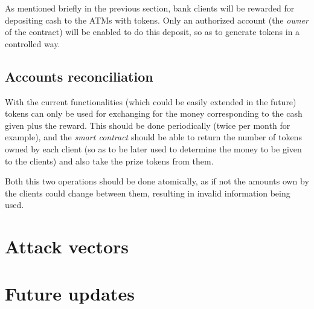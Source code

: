 \documentclass[a4paper]{article}
\begin{document}
As mentioned briefly in the previous section, bank clients will be rewarded for depositing cash to the ATMs with tokens. Only an authorized account (the \textit{owner} of the contract) will be enabled to do this deposit, so as to generate tokens in a controlled way.

\subsection{Accounts reconciliation}

With the current functionalities (which could be easily extended in the future) tokens can only be used for exchanging for the money corresponding to the cash given plus the reward. This should be done periodically (twice per month for example), and the \textit{smart contract} should be able to return the number of tokens owned by each client (so as to be later used to determine the money to be given to the clients) and also take the prize tokens from them.

Both this two operations should be done atomically, as if not the amounts own by the clients could change between them, resulting in invalid information being used.


\section{Attack vectors} %

\section{Future updates}
\end{document}
